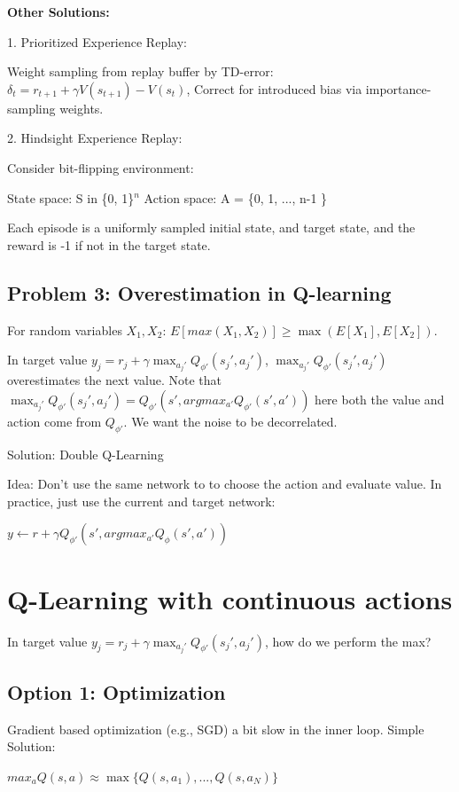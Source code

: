\documentclass{article}
\begin{document}
\textbf{Other Solutions:}

1. Prioritized Experience Replay:

Weight sampling from replay buffer by TD-error: $\delta_t = r_{t+1} + \gamma V(s_{t+1}) - V(s_t)$, Correct for introduced bias via importance-sampling weights.

2. Hindsight Experience Replay:

Consider bit-flipping environment:

State space: S in \{0, 1\}$^n$
  Action space: A = \{0, 1, ..., n-1 \}

Each episode is a uniformly sampled initial state, and target state, and the reward is -1 if not in the target state.


\subsection{Problem 3: Overestimation in Q-learning}
For random variables $X_1, X_2$:
$E[max(X_1, X_2)] \geq \max(E[X_1], E[X_2])$.

In target value $y_j = r_j + \gamma \max_{a_j'} Q_{\phi'}(s_j', a_j')$, $\max_{a_j'} Q_{\phi'}(s_j', a_j')$ overestimates the next value. Note that $\max_{a_j'} Q_{\phi'}(s_j', a_j')= Q_{\phi'}(s', argmax_{a'}Q_{\phi'}(s', a'))$ here both the value and action come from $Q_{\phi'}$. We want the noise to be decorrelated. 

Solution: Double Q-Learning

Idea: Don't use the same network to to choose the action and evaluate value. In practice, just use the current and target network:

$y \leftarrow r+ \gamma Q_{\phi'}(s', argmax_{a'}Q_{\phi}(s', a'))$



\section{Q-Learning with continuous actions}
In target value $y_j = r_j + \gamma \max_{a_j'} Q_{\phi'}(s_j', a_j')$, how do we perform the max?

\subsection{Option 1: Optimization}
Gradient based optimization (e.g., SGD) a bit slow in the inner loop.
Simple Solution:

$max_a Q(s, a) \approx \max\{ Q(s,a_1), ..., Q(s, a_N)\}$
\end{document}
